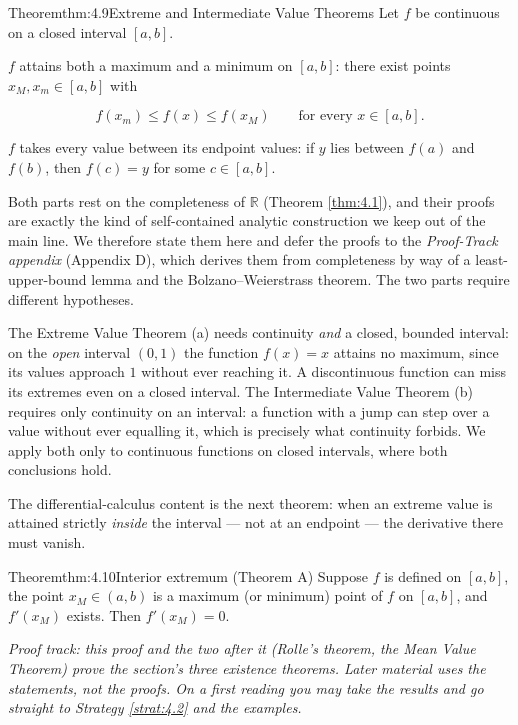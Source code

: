 \documentclass[a4paper,12pt,oneside]{memoir}
\begin{document}
\begin{envtheorem}{Theorem}{thm:4.9}{Extreme and Intermediate Value Theorems}
Let \(f\) be continuous on a closed interval \([a, b]\).

 \(f\) attains both a maximum and a minimum on \([a, b]\): there exist points \(x_{M}, x_{m} \in [a, b]\) with

\[ f(x_{m}) \le f(x) \le f(x_{M}) \qquad \text{for every } x \in [a, b]. \]

 \(f\) takes every value between its endpoint values: if \(y\) lies between \(f(a)\) and \(f(b)\), then \(f(c) = y\) for some \(c \in [a, b]\).
\end{envtheorem}
Both parts rest on the completeness of \(\mathbb{R}\) (Theorem \ref{thm:4.1}), and their proofs are exactly the kind of self-contained analytic construction we keep out of the main line. We therefore state them here and defer the proofs to the \emph{Proof-Track appendix} (Appendix D), which derives them from completeness by way of a least-upper-bound lemma and the Bolzano–Weierstrass theorem. The two parts require different hypotheses.

The Extreme Value Theorem (a) needs continuity \emph{and} a closed, bounded interval: on the \emph{open} interval \((0, 1)\) the function \(f(x) = x\) attains no maximum, since its values approach \(1\) without ever reaching it. A discontinuous function can miss its extremes even on a closed interval. The Intermediate Value Theorem (b) requires only continuity on an interval: a function with a jump can step over a value without ever equalling it, which is precisely what continuity forbids. We apply both only to continuous functions on closed intervals, where both conclusions hold.

The differential-calculus content is the next theorem: when an extreme value is attained strictly \emph{inside} the interval — not at an endpoint — the derivative there must vanish.

\begin{envtheorem}{Theorem}{thm:4.10}{Interior extremum (Theorem A)}
Suppose \(f\) is defined on \([a, b]\), the point \(x_{M} \in (a, b)\) is a maximum (or minimum) point of \(f\) on \([a, b]\), and \(f'(x_{M})\) exists. Then \(f'(x_{M}) = 0\).
\end{envtheorem}
\emph{Proof track: this proof and the two after it (Rolle’s theorem, the Mean Value Theorem) prove the section’s three existence theorems. Later material uses the statements, not the proofs. On a first reading you may take the results and go straight to Strategy \ref{strat:4.2} and the examples.}
\end{document}
